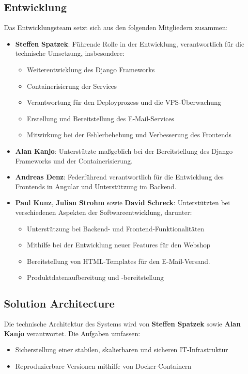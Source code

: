 \documentclass[%
	12pt,
	a4paper,
	oneside,
	parskip=full
]{scrbook}
\begin{document}
\subsection{Entwicklung}
Das Entwicklungsteam setzt sich aus den folgenden Mitgliedern zusammen:
\begin{itemize}
	\item \textbf{Steffen Spatzek}: Führende Rolle in der Entwicklung, verantwortlich für die technische Umsetzung, insbesondere:
	\begin{itemize}
		\item Weiterentwicklung des Django Frameworks
		\item Containerisierung der Services
		\item Verantwortung für den Deployprozess und die VPS-Überwachung
		\item Erstellung und Bereitstellung des E-Mail-Services
		\item Mitwirkung bei der Fehlerbehebung und Verbesserung des Frontends 
	\end{itemize}
	\item \textbf{Alan Kanjo}: Unterstützte maßgeblich bei der Bereitstellung des Django Frameworks und der Containerisierung.
	\item \textbf{Andreas Denz}: Federführend verantwortlich für die Entwicklung des Frontends in Angular und Unterstützung im Backend.
	\item \textbf{Paul Kunz}, \textbf{Julian Strohm} sowie \textbf{David Schreck}: Unterstützten bei verschiedenen Aspekten der Softwareentwicklung, darunter:
	\begin{itemize}
		\item Unterstützung bei Backend- und Frontend-Funktionalitäten
		\item Mithilfe bei der Entwicklung neuer Features für den Webshop
		\item Bereitstellung von HTML-Templates für den E-Mail-Versand. 
		\item Produktdatenaufbereitung und -bereitstellung
	\end{itemize}
\end{itemize}

\subsection{Solution Architecture}
Die technische Architektur des Systems wird von \textbf{Steffen Spatzek} sowie \textbf{Alan Kanjo} verantwortet. Die Aufgaben umfassen:
\begin{itemize}
	\item Sicherstellung einer stabilen, skalierbaren und sicheren IT-Infrastruktur
	\item Reproduzierbare Versionen mithilfe von Docker-Containern
\end{itemize}
\end{document}

